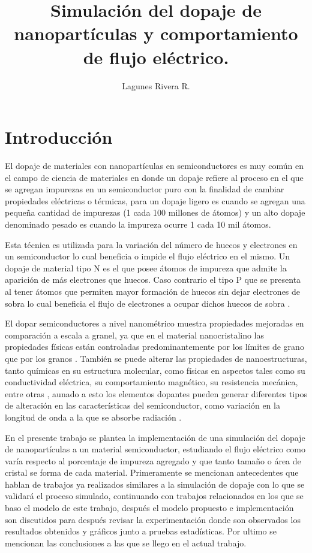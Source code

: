 \documentclass[9pt,twocolumn,twoside]{osajnl}
\title{Simulación del dopaje de nanopartículas y comportamiento de flujo eléctrico.}
\author{Lagunes Rivera R.}
\affil{Universidad Autónoma de Nuevo León, Facultad de Ingeniería Mecánica y Eléctrica.}
\affil{Maestría en Ciencias de la Ingeniería con Orientación en Nanotecnología.}
\affil{Contacto: \href{mailto:raul.lagunesr@uanl.edu.mx}{raul.lagunesr@uanl.edu.mx} \hspace{2cm} Github: \href{https://github.com/Raullr28}{Raullr28}}
\begin{document}
\maketitle

\section{Introducción}
El dopaje de materiales con nanopartículas en semiconductores es muy común en el campo de ciencia de materiales en donde un dopaje refiere al proceso en el que se agregan impurezas en un semiconductor puro con la finalidad de cambiar propiedades eléctricas o térmicas, para un dopaje ligero es cuando se agregan una pequeña cantidad de impurezas (1 cada 100 millones de átomos) y un alto dopaje denominado pesado es cuando la impureza ocurre 1 cada 10 mil átomos.

Esta técnica es utilizada para la variación del número de huecos y electrones en un semiconductor lo cual beneficia o impide el flujo eléctrico en el mismo. Un dopaje de material tipo N es el que posee átomos de impureza que admite la aparición de más electrones que huecos.
Caso contrario el tipo P que se presenta al tener átomos que permiten mayor formación de huecos sin dejar electrones de sobra lo cual beneficia el flujo de electrones a ocupar dichos huecos de sobra \cite{schroder2015semiconductor}.

El dopar semiconductores a nivel nanométrico muestra propiedades mejoradas en comparación a escala a granel, ya que en el material nanocristalino las propiedades físicas están controladas predominantemente por los límites de grano que por los granos \cite{nongjai2012magnetic}. También se puede alterar las propiedades de nanoestructuras, tanto químicas en su estructura molecular, como físicas en aspectos tales como su conductividad eléctrica, su comportamiento magnético, su resistencia mecánica, entre otras \cite{tesis}, aunado a esto los elementos dopantes pueden generar diferentes tipos de alteración en las características del semiconductor, como variación en la longitud de onda a la que se absorbe radiación \cite{tesis2}.

En el presente trabajo se plantea la implementación de una simulación del dopaje de nanopartículas a un material semiconductor, estudiando el flujo eléctrico como varía respecto al porcentaje de impureza agregado y que tanto tamaño o área de cristal se forma de cada material. Primeramente se mencionan antecedentes que hablan de trabajos ya realizados similares a la simulación de dopaje con lo que se validará el proceso simulado, continuando con trabajos relacionados en los que se baso el modelo de este trabajo, después el modelo propuesto e implementación son discutidos para después revisar la experimentación donde son observados los resultados obtenidos y gráficos junto a pruebas estadísticas. Por ultimo se mencionan las conclusiones a las que se llego en el actual trabajo. 
\end{document}
